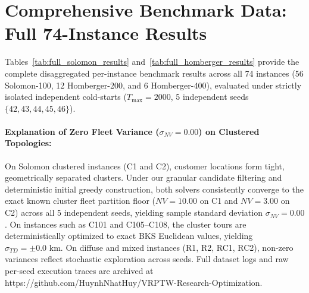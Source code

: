 \documentclass{article}
\begin{document}
\section{Comprehensive Benchmark Data: Full 74-Instance Results}
\label{sec:full_instance_results}

Tables~\ref{tab:full_solomon_results} and~\ref{tab:full_homberger_results} provide the complete disaggregated per-instance benchmark results across all 74 instances (56 Solomon-100, 12 Homberger-200, and 6 Homberger-400), evaluated under strictly isolated independent cold-starts ($T_{\max}=2000$, 5 independent seeds $\{42, 43, 44, 45, 46\}$). 

\paragraph{Explanation of Zero Fleet Variance ($\sigma_{NV}=0.00$) on Clustered Topologies:} On Solomon clustered instances (C1 and C2), customer locations form tight, geometrically separated clusters. Under our granular candidate filtering and deterministic initial greedy construction, both solvers consistently converge to the exact known cluster fleet partition floor ($NV=10.00$ on C1 and $NV=3.00$ on C2) across all 5 independent seeds, yielding sample standard deviation $\sigma_{NV}=0.00$. On instances such as C101 and C105--C108, the cluster tours are deterministically optimized to exact BKS Euclidean values, yielding $\sigma_{TD}=\pm 0.0\text{ km}$. On diffuse and mixed instances (R1, R2, RC1, RC2), non-zero variances reflect stochastic exploration across seeds. Full dataset logs and raw per-seed execution traces are archived at \textsf{https://github.com/HuynhNhatHuy/VRPTW-Research-Optimization}.
\end{document}
